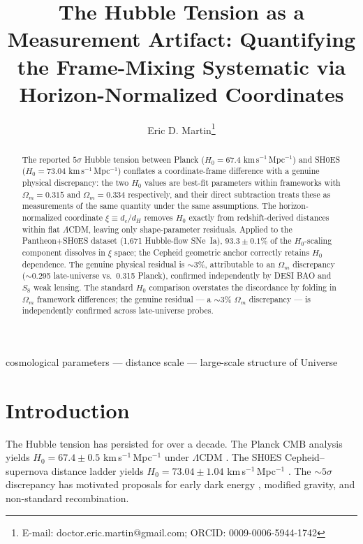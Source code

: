 \documentclass[usenatbib]{mnras}
\title[Hubble Tension as a Measurement Artifact]{The Hubble Tension as a Measurement Artifact:
Quantifying the Frame-Mixing Systematic via
Horizon-Normalized Coordinates}
\author[E.~D.~Martin]{Eric D. Martin\thanks{E-mail: doctor.eric.martin@gmail.com;
ORCID: 0009-0006-5944-1742}}
\date{}
\begin{document}
\maketitle

\begin{abstract}
The reported $5\sigma$ Hubble tension between Planck ($H_0 = 67.4$
km\,s$^{-1}$\,Mpc$^{-1}$) and SH0ES ($H_0 = 73.04$ km\,s$^{-1}$\,Mpc$^{-1}$)
conflates a coordinate-frame difference with a genuine physical discrepancy:
the two $H_0$ values are best-fit parameters within frameworks with
$\Omega_m = 0.315$ and $\Omega_m = 0.334$ respectively, and their direct
subtraction treats these as measurements of the same quantity under the same
assumptions. The horizon-normalized coordinate $\xi \equiv d_c/d_H$ removes
$H_0$ exactly from redshift-derived distances within flat $\Lambda$CDM,
leaving only shape-parameter residuals. Applied to the Pantheon+SH0ES
dataset (1,671 Hubble-flow SNe~Ia), $93.3\pm0.1$\% of the $H_0$-scaling
component dissolves in $\xi$ space; the Cepheid geometric anchor correctly
retains $H_0$ dependence. The genuine physical residual is $\sim$3\%,
attributable to an $\Omega_m$ discrepancy ($\sim$0.295 late-universe
vs.\ 0.315 Planck), confirmed independently by DESI BAO and $S_8$ weak
lensing. The standard $H_0$ comparison overstates the discordance by folding in $\Omega_m$ framework differences; the genuine residual --- a $\sim$3\% $\Omega_m$ discrepancy --- is independently confirmed across late-universe probes.
\end{abstract}

\begin{keywords}
cosmological parameters --- distance scale --- large-scale structure of Universe
\end{keywords}

\section{Introduction}

The Hubble tension has persisted for over a decade.
The Planck CMB analysis yields $H_0 = 67.4 \pm 0.5$
km\,s$^{-1}$\,Mpc$^{-1}$ under $\Lambda$CDM \citep{planck2020}.
The SH0ES Cepheid--supernova distance ladder yields
$H_0 = 73.04 \pm 1.04$ km\,s$^{-1}$\,Mpc$^{-1}$ \citep{riess2022}.
The $\sim5\sigma$ discrepancy has motivated proposals for early dark energy
\citep{poulin2019}, modified gravity, and non-standard recombination.
\end{document}
